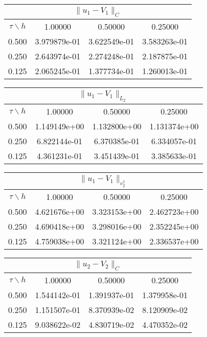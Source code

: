 \begin{center}
\begin{tabular}{||c|c|c|c||}
\hline
\hline
\multicolumn{4}{||c||}{$\|u_1-V_1\| _{C}$}\\ 
\hline
\hline
$\tau \backslash h$ & 1.00000 & 0.50000 & 0.25000\\ 
\hline 
0.500& 3.979879e-01 &3.622549e-01 &3.583263e-01 \\ 
\hline
0.250& 2.643974e-01 &2.274248e-01 &2.187875e-01 \\ 
\hline
0.125& 2.065245e-01 &1.377734e-01 &1.260013e-01 \\ 
\hline
\hline
\end{tabular}
\end{center}
\begin{center}
\begin{tabular}{||c|c|c|c||}
\hline
\hline
\multicolumn{4}{||c||}{$\|u_1-V_1\| _{L_2}$}\\ 
\hline
\hline
$\tau \backslash h$ & 1.00000 & 0.50000 & 0.25000\\ 
\hline 
0.500& 1.149149e+00 &1.132800e+00 &1.131374e+00 \\ 
\hline
0.250& 6.822144e-01 &6.370385e-01 &6.334057e-01 \\ 
\hline
0.125& 4.361231e-01 &3.451439e-01 &3.385633e-01 \\ 
\hline
\hline
\end{tabular}
\end{center}
\begin{center}
\begin{tabular}{||c|c|c|c||}
\hline
\hline
\multicolumn{4}{||c||}{$\|u_1-V_1\| _{v_2^1}$}\\ 
\hline
\hline
$\tau \backslash h$ & 1.00000 & 0.50000 & 0.25000\\ 
\hline 
0.500& 4.621676e+00 &3.323153e+00 &2.462723e+00 \\ 
\hline
0.250& 4.690418e+00 &3.298016e+00 &2.352245e+00 \\ 
\hline
0.125& 4.759038e+00 &3.321124e+00 &2.336537e+00 \\ 
\hline
\hline
\end{tabular}
\end{center}
\begin{center}
\begin{tabular}{||c|c|c|c||}
\hline
\hline
\multicolumn{4}{||c||}{$\|u_2- V_2\| _{C}$}\\ 
\hline
\hline
$\tau \backslash h$ & 1.00000 & 0.50000 & 0.25000\\ 
\hline 
0.500& 1.544142e-01 &1.391937e-01 &1.379958e-01 \\ 
\hline
0.250& 1.151507e-01 &8.370939e-02 &8.120909e-02 \\ 
\hline
0.125& 9.038622e-02 &4.830719e-02 &4.470352e-02 \\ 
\hline
\hline
\end{tabular}
\end{center}
